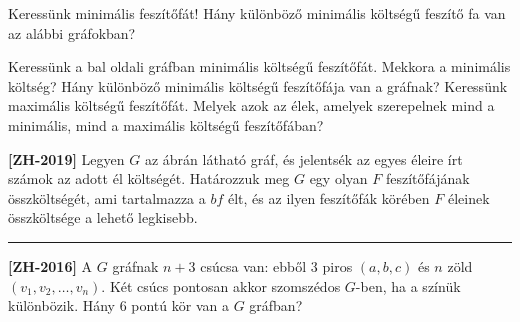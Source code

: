 \documentclass[a4paper,12pt]{article}
\begin{document}
    \noindent{}
    \noindent{}
    \begin{enumerate}
        \item Keressünk minimális feszítőfát! Hány különböző minimális költségű feszítő fa van az alábbi gráfokban?
        \begin{figure}[!h]
            \centering
             \hspace{1in}
            
        \end{figure}

        \begin{minipage}{0.3\textwidth}
            \centering
            
        \end{minipage}
        \hfill
        \begin{minipage}{0.6\textwidth}
            \item Keressünk a bal oldali gráfban minimális költségű feszítőfát. Mekkora a minimális költség? Hány különböző minimális költségű feszítőfája van a gráfnak? Keressünk maximális költségű feszítőfát. Melyek azok az élek, amelyek szerepelnek mind a minimális, mind a maximális költségű feszítőfában?
        \end{minipage}

        \begin{minipage}{0.6\textwidth}
            \item \textbf{[ZH-2019]} Legyen $G$ az ábrán látható gráf, és jelentsék az egyes éleire írt számok az adott él költségét. Határozzuk meg $G$ egy olyan $F$ feszítőfájának összköltségét, ami tartalmazza a $bf$ élt, és az ilyen feszítőfák körében $F$ éleinek összköltsége a lehető legkisebb.
        \end{minipage}
        \begin{minipage}{0.3\textwidth}
            \centering
            
        \end{minipage}
        \hrule
        
        \item \textbf{[ZH-2016]} A $G$ gráfnak $n+3$ csúcsa van: ebből $3$ piros $(a, b, c)$ és $n$ zöld $(v_1, v_2, \ldots, v_n)$. Két csúcs pontosan akkor szomszédos $G$-ben, ha a színük különbözik. Hány $6$ pontú kör van a $G$ gráfban?
        

\end{enumerate}
\end{document}
